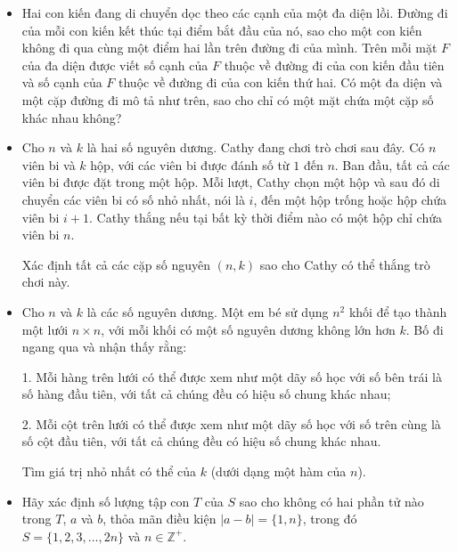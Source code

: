 \documentclass[11pt]{scrartcl}
\begin{document}
\begin{itemize}[label=, leftmargin=0em, itemsep=0.5em]
   
    \item \begin{btvn}
        Hai con kiến đang di chuyển dọc theo các cạnh của một đa diện lồi. Đường đi của mỗi con kiến kết thúc tại điểm bắt đầu của nó, sao cho một con kiến không đi qua cùng một điểm hai lần trên đường đi của mình. Trên mỗi mặt $F$ của đa diện được viết số cạnh của $F$ thuộc về đường đi của con kiến đầu tiên và số cạnh của $F$ thuộc về đường đi của con kiến thứ hai. Có một đa diện và một cặp đường đi mô tả như trên, sao cho chỉ có một mặt chứa một cặp số khác nhau không?
    \end{btvn}
    \item \begin{btvn}
        Cho \( n \) và \( k \) là hai số nguyên dương. Cathy đang chơi trò chơi sau đây. Có \( n \) viên bi và \( k \) hộp, với các viên bi được đánh số từ \( 1 \) đến \( n \). Ban đầu, tất cả các viên bi được đặt trong một hộp. Mỗi lượt, Cathy chọn một hộp và sau đó di chuyển các viên bi có số nhỏ nhất, nói là \( i \), đến một hộp trống hoặc hộp chứa viên bi \( i+1 \). Cathy thắng nếu tại bất kỳ thời điểm nào có một hộp chỉ chứa viên bi \( n \).

        Xác định tất cả các cặp số nguyên \( (n,k) \) sao cho Cathy có thể thắng trò chơi này.

    \end{btvn}
    \item \begin{btvn}
        Cho \( n \) và \( k \) là các số nguyên dương. Một em bé sử dụng \( n^2 \) khối để tạo thành một lưới \( n \times n \), với mỗi khối có một số nguyên dương không lớn hơn \( k \). Bố đi ngang qua và nhận thấy rằng:

        1. Mỗi hàng trên lưới có thể được xem như một dãy số học với số bên trái là số hàng đầu tiên, với tất cả chúng đều có hiệu số chung khác nhau;
        
        2. Mỗi cột trên lưới có thể được xem như một dãy số học với số trên cùng là số cột đầu tiên, với tất cả chúng đều có hiệu số chung khác nhau.

        Tìm giá trị nhỏ nhất có thể của \( k \) (dưới dạng một hàm của \( n \)).

    \end{btvn}
    \item \begin{btvn}
        Hãy xác định số lượng tập con $T$ của $S$ sao cho không có hai phần tử nào trong $T$, $a$ và $b$, thỏa mãn điều kiện $|a-b|=\{1,n\}$, trong đó $S =\{1,2,3, \ldots, 2n\}$ và $n \in \mathbb{Z}^+$.
    \end{btvn}


\end{itemize}
\end{document}
